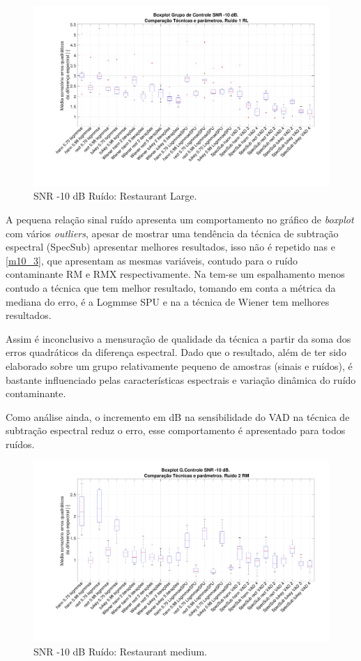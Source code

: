 \begin{figure}[H]
\centering
\includegraphics[width=16cm]{Figs/Erro_m10_Ruido1.pdf}
\caption{SNR -10 dB Ruído: Restaurant Large.}
\label{m10_1}
\end{figure}

A pequena relação sinal ruído apresenta um comportamento no gráfico de \textit{boxplot} com vários \textit{outliers}, apesar de mostrar uma tendência da técnica de subtração espectral (SpecSub) apresentar melhores resultados, isso não é repetido nas  e \ref{m10_3}, que apresentam as mesmas variáveis, contudo para o ruído contaminante RM e RMX respectivamente. Na  tem-se um espalhamento menos contudo a técnica que tem melhor resultado, tomando em conta a métrica da mediana do erro, é a Logmmse SPU e na  a técnica de Wiener tem melhores resultados. 

Assim é inconclusivo a mensuração de qualidade da técnica a partir da soma dos erros quadráticos da diferença espectral. Dado que o resultado, além de ter sido elaborado sobre um grupo relativamente pequeno de amostras (sinais e ruídos), é bastante influenciado pelas características espectrais e variação dinâmica do ruído contaminante. 

Como análise ainda, o incremento em dB na sensibilidade do VAD na técnica de subtração espectral reduz o erro, esse comportamento é apresentado para todos ruídos.

\begin{figure}[H]
\centering
\includegraphics[width=16cm]{Figs/Erro_m10_Ruido2.pdf}
\caption{SNR -10 dB Ruído: Restaurant medium.}
\label{m10_2}
\end{figure}

